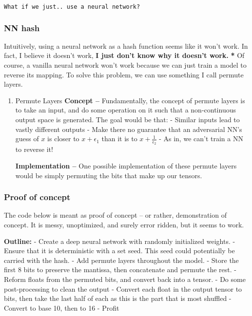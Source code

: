 \documentclass[letterpaper]{article}
\begin{document}
\begin{verbatim}
What if we just.. use a neural network?
\end{verbatim}

\subsubsection{NN hash}
\label{sec:org8288675}
Intuitively, using a neural network as a hash function seems like it
won't work. In fact, I believe it doesn't work, \textbf{I just don't know why
it doesn't work.} \textbf{*} Of course, a vanilla neural network won't work
because we can just train a model to reverse its mapping. To solve this
problem, we can use something I call permute layers.

\begin{enumerate}
\item Permute Layers
\label{sec:orgb0fc552}
\textbf{Concept --} Fundamentally, the concept of permute layers is to take an
input, and do some operation on it such that a non-continuous output
space is generated. The goal would be that: - Similar inputs lead to
vastly different outputs - Make there no guarantee that an adversarial
NN's guess of \(x\) is closer to \(x+\epsilon_1\) than it is to
\(x+ \frac{1}{\epsilon_2}\) - As in, we can't train a NN to reverse it!

\textbf{Implementation --} One possible implementation of these permute layers
would be simply permuting the bits that make up our tensors.
\end{enumerate}

\subsubsection{Proof of concept}
\label{sec:orgcdc77b6}
The code below is meant as proof of concept -- or rather, demonstration
of concept. It is messy, unoptimized, and surely error ridden, but it
seems to work.

\textbf{Outline:} - Create a deep neural network with randomly initialized
weights. - Ensure that it is deterministic with a set seed. This seed
could potentially be carried with the hash. - Add permute layers
throughout the model. - Store the first 8 bits to preserve the mantissa,
then concatenate and permute the rest. - Reform floats from the permuted
bits, and convert back into a tensor. - Do some post-processing to clean
the output - Convert each float in the output tensor to bits, then take
the last half of each as this is the part that is most shuffled -
Convert to base 10, then to 16 - Profit
\end{document}
